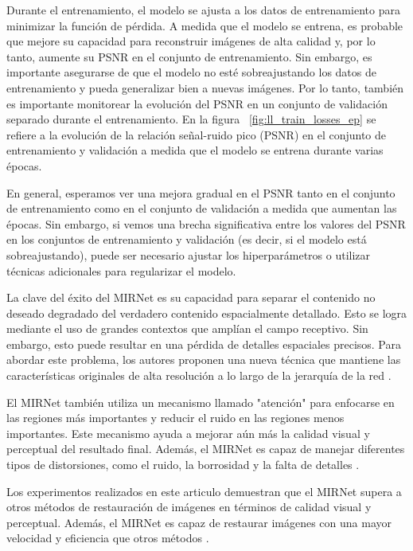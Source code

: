 \documentclass[a4paper,
               ]{jacow}
\begin{document}
Durante el entrenamiento, el modelo se ajusta a los datos de entrenamiento para minimizar la función de pérdida. A medida que el modelo se entrena, es probable que mejore su capacidad para reconstruir imágenes de alta calidad y, por lo tanto, aumente su PSNR en el conjunto de entrenamiento. Sin embargo, es importante asegurarse de que el modelo no esté sobreajustando los datos de entrenamiento y pueda generalizar bien a nuevas imágenes. Por lo tanto, también es importante monitorear la evolución del PSNR en un conjunto de validación separado durante el entrenamiento. En la figura  ~\ref{fig:ll_train_losses_ep} se refiere a la evolución de la relación señal-ruido pico (PSNR) en el conjunto de entrenamiento y validación a medida que el modelo se entrena durante varias épocas.

En general, esperamos ver una mejora gradual en el PSNR tanto en el conjunto de entrenamiento como en el conjunto de validación a medida que aumentan las épocas. Sin embargo, si vemos una brecha significativa entre los valores del PSNR en los conjuntos de entrenamiento y validación (es decir, si el modelo está sobreajustando), puede ser necesario ajustar los hiperparámetros o utilizar técnicas adicionales para regularizar el modelo.

La clave del éxito del MIRNet es su capacidad para separar el contenido no deseado degradado del verdadero contenido espacialmente detallado. Esto se logra mediante el uso de grandes contextos que amplían el campo receptivo. Sin embargo, esto puede resultar en una pérdida de detalles espaciales precisos. Para abordar este problema, los autores proponen una nueva técnica que mantiene las características originales de alta resolución a lo largo de la jerarquía de la red \cite{tian2020learning}.


El MIRNet también utiliza un mecanismo llamado "atención" para enfocarse en las regiones más importantes y reducir el ruido en las regiones menos importantes. Este mecanismo ayuda a mejorar aún más la calidad visual y perceptual del resultado final. Además, el MIRNet es capaz de manejar diferentes tipos de distorsiones, como el ruido, la borrosidad y la falta de detalles \cite{tian2020learning}.

Los experimentos realizados en este articulo demuestran que el MIRNet supera a otros métodos de restauración de imágenes en términos de calidad visual y perceptual. Además, el MIRNet es capaz de restaurar imágenes con una mayor velocidad y eficiencia que otros métodos \cite{tian2020learning}.
\end{document}
